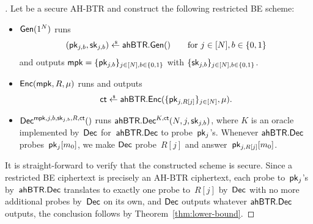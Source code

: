 \begin{proof}[]
Let
be a secure AH-BTR and
construct the following restricted BE scheme:
\begin{itemize}
\item $\Gen(1^N)$ runs
\begin{align*}
(\pk_{j,b},\sk_{j,b})\draws\AHBTR.\Gen()\qquad\textup{for }j\in[N],b\in\bit
\end{align*}
and outputs ${\mpk=\{\pk_{j,b}\}_{j\in[N],b\in\bit}}$ with $\{\sk_{j,b}\}_{j\in[N],b\in\bit}$.
\item $\Enc(\mpk,R,\mu)$ runs and outputs
\begin{align*}
\ct\draws\AHBTR.\Enc(\{\pk_{j,R[j]}\}_{j\in[N]},\mu).
\end{align*}
\item $\Dec^{\mpk,j,b,\sk_{j,b},R,\ct}()$
runs $\AHBTR.\Dec^{K,\ct}(N,j,\sk_{j,b})$,
where $K$ is an oracle implemented by~$\Dec$ for~$\AHBTR.\Dec$ to probe~$\pk_j$'s.
Whenever $\AHBTR.\Dec$ probes~$\pk_j[m_0]$,
we make $\Dec$ probe~$R[j]$ and answer~$\pk_{j,R[j]}[m_0]$.
\end{itemize}
It is straight-forward to verify that the constructed scheme is secure.
Since
a restricted BE ciphertext is precisely an AH-BTR ciphertext,
each probe to~$\pk_j$'s by~$\AHBTR.\Dec$ translates to exactly one probe to~$R[j]$ by~$\Dec$ with no more additional probes by~$\Dec$ on its own, and
$\Dec$ outputs whatever $\AHBTR.\Dec$ outputs,
the conclusion follows by Theorem~\ref{thm:lower-bound}.
\end{proof}
